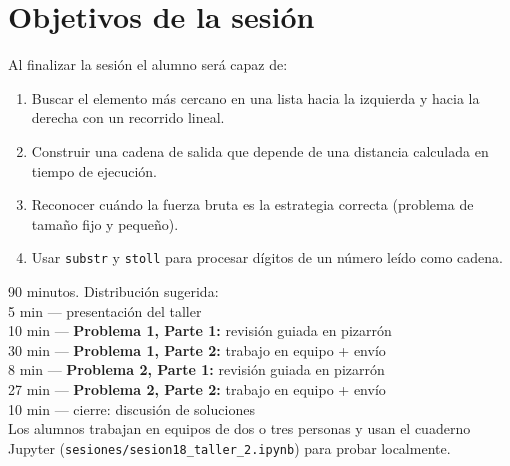 \documentclass[12pt, oneside]{article}
\begin{document}

\tableofcontents
\newpage

\section{Objetivos de la sesión}

Al finalizar la sesión el alumno será capaz de:

\begin{enumerate}
  \item Buscar el elemento más cercano en una lista hacia la izquierda
        y hacia la derecha con un recorrido lineal.
  \item Construir una cadena de salida que depende de una distancia
        calculada en tiempo de ejecución.
  \item Reconocer cuándo la fuerza bruta es la estrategia correcta
        (problema de tamaño fijo y pequeño).
  \item Usar \texttt{substr} y \texttt{stoll} para procesar dígitos
        de un número leído como cadena.
\end{enumerate}

\begin{notaprofesor}
  90 minutos.  Distribución sugerida:\\
  \phantom{00} 5 min — presentación del taller \\
  \phantom{00}10 min — \textbf{Problema 1, Parte 1:} revisión guiada en pizarrón \\
  \phantom{00}30 min — \textbf{Problema 1, Parte 2:} trabajo en equipo + envío \\
  \phantom{00} 8 min — \textbf{Problema 2, Parte 1:} revisión guiada en pizarrón \\
  \phantom{00}27 min — \textbf{Problema 2, Parte 2:} trabajo en equipo + envío \\
  \phantom{00}10 min — cierre: discusión de soluciones \\[4pt]
  Los alumnos trabajan en equipos de dos o tres personas y usan el
  cuaderno Jupyter (\texttt{sesiones/sesion18\_taller\_2.ipynb}) para
  probar localmente.
\end{notaprofesor}

\end{document}
